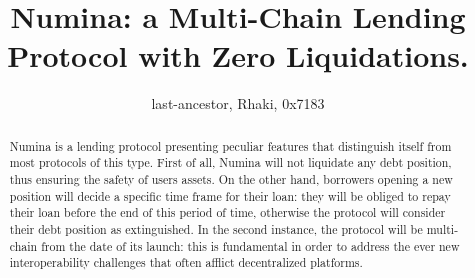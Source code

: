 \documentclass[12pt]{paper}
\title{Numina: a Multi-Chain Lending Protocol with Zero Liquidations.}
\author{last-ancestor, Rhaki, 0x7183}
\date{}
\begin{document}
\maketitle


\begin{abstract}
	Numina is a lending protocol presenting peculiar features that distinguish itself from most protocols of this type. First of all, Numina will not liquidate any debt position, thus ensuring the safety of users assets. On the other hand, borrowers opening a new position will decide a specific time frame for their loan: they will be obliged to repay their loan before the end of this period of time, otherwise the protocol will consider their debt position as extinguished. In the second instance, the protocol will be multi-chain from the date of its launch: this is fundamental in order to address the ever new interoperability challenges that often afflict decentralized platforms.
\end{abstract}
	
\end{document}
